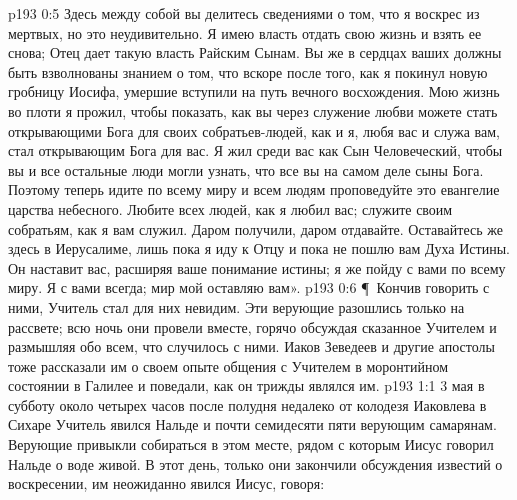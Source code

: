 \vs p193 0:5 Здесь между собой вы делитесь сведениями о том, что я воскрес из мертвых, но это неудивительно. Я имею власть отдать свою жизнь и взять ее снова; Отец дает такую власть Райским Сынам. Вы же в сердцах ваших должны быть взволнованы знанием о том, что вскоре после того, как я покинул новую гробницу Иосифа, умершие вступили на путь вечного восхождения. Мою жизнь во плоти я прожил, чтобы показать, как вы через служение любви можете стать открывающими Бога для своих собратьев\hyp{}людей, как и я, любя вас и служа вам, стал открывающим Бога для вас. Я жил среди вас как Сын Человеческий, чтобы вы и все остальные люди могли узнать, что все вы на самом деле сыны Бога. Поэтому теперь идите по всему миру и всем людям проповедуйте это евангелие царства небесного. Любите всех людей, как я любил вас; служите своим собратьям, как я вам служил. Даром получили, даром отдавайте. Оставайтесь же здесь в Иерусалиме, лишь пока я иду к Отцу и пока не пошлю вам Духа Истины. Он наставит вас, расширяя ваше понимание истины; я же пойду с вами по всему миру. Я с вами всегда; мир мой оставляю вам».
\vs p193 0:6 \P\ Кончив говорить с ними, Учитель стал для них невидим. Эти верующие разошлись только на рассвете; всю ночь они провели вместе, горячо обсуждая сказанное Учителем и размышляя обо всем, что случилось с ними. Иаков Зеведеев и другие апостолы тоже рассказали им о своем опыте общения с Учителем в моронтийном состоянии в Галилее и поведали, как он трижды являлся им.
\vs p193 1:1 3 мая в субботу около четырех часов после полудня недалеко от колодезя Иаковлева в Сихаре Учитель явился Нальде и почти семидесяти пяти верующим самарянам. Верующие привыкли собираться в этом месте, рядом с которым Иисус говорил Нальде о воде живой. В этот день, только они закончили обсуждения известий о воскресении, им неожиданно явился Иисус, говоря:
